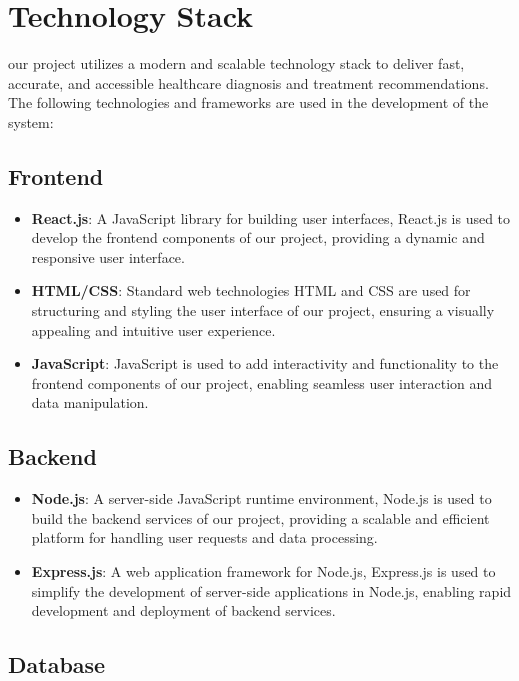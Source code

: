 \documentclass[onecolumn]{article}
\begin{document}
\section{Technology Stack}
our project utilizes a modern and scalable technology stack to deliver fast, accurate, and accessible healthcare diagnosis and treatment recommendations. The following technologies and frameworks are used in the development of the system:

\subsection{Frontend}

\begin{itemize}
\item \textbf{React.js}: A JavaScript library for building user interfaces, React.js is used to develop the frontend components of our project, providing a dynamic and responsive user interface.
\item \textbf{HTML/CSS}: Standard web technologies HTML and CSS are used for structuring and styling the user interface of our project, ensuring a visually appealing and intuitive user experience.
\item \textbf{JavaScript}: JavaScript is used to add interactivity and functionality to the frontend components of our project, enabling seamless user interaction and data manipulation.
\end{itemize}

\subsection{Backend}

\begin{itemize}
\item \textbf{Node.js}: A server-side JavaScript runtime environment, Node.js is used to build the backend services of our project, providing a scalable and efficient platform for handling user requests and data processing.
\item \textbf{Express.js}: A web application framework for Node.js, Express.js is used to simplify the development of server-side applications in Node.js, enabling rapid development and deployment of backend services.
\end{itemize}

\subsection{Database}
\end{document}
